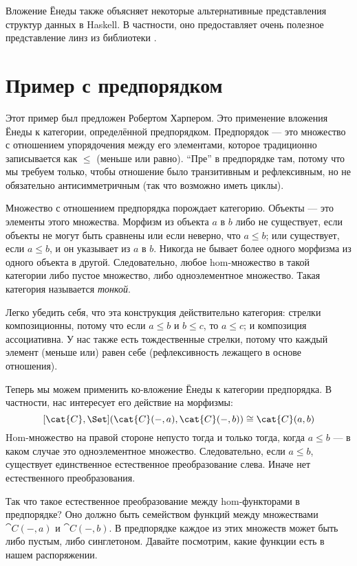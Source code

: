Вложение Ёнеды также объясняет некоторые альтернативные
представления структур данных в Haskell. В частности, оно
предоставляет 
{очень полезное представление}
линз из библиотеки .

\section{Пример с предпорядком}

Этот пример был предложен Робертом Харпером. Это применение
вложения Ёнеды к категории, определённой предпорядком. Предпорядок --- это
множество с отношением упорядочения между его элементами, которое традиционно
записывается как $\leqslant$ (меньше или равно). ``Пре'' в
предпорядке там, потому что мы требуем только, чтобы отношение было
транзитивным и рефлексивным, но не обязательно антисимметричным (так что
возможно иметь циклы).

Множество с отношением предпорядка порождает категорию. Объекты
--- это элементы этого множества. Морфизм из объекта $a$ в
$b$ либо не существует, если объекты не могут быть сравнены или если
неверно, что $a \leqslant b$; или существует, если
$a \leqslant b$, и он указывает из $a$ в
$b$. Никогда не бывает более одного морфизма из одного объекта в
другой. Следовательно, любое hom-множество в такой категории либо пустое множество,
либо одноэлементное множество. Такая категория называется \emph{тонкой}.

Легко убедить себя, что эта конструкция действительно категория:
стрелки композиционны, потому что если
$a \leqslant b$ и $b \leqslant c$, то
$a \leqslant c$; и композиция ассоциативна. У нас также
есть тождественные стрелки, потому что каждый элемент (меньше или) равен
себе (рефлексивность лежащего в основе отношения).

Теперь мы можем применить ко-вложение Ёнеды к категории предпорядка. В
частности, нас интересует его действие на морфизмы:
\[[\cat{C}, \Set](\cat{C}(-, a), \cat{C}(-, b)) \cong \cat{C}(a, b)\]
Hom-множество на правой стороне непусто тогда и только тогда, когда
$a \leqslant b$ --- в каком случае это одноэлементное множество.
Следовательно, если $a \leqslant b$, существует единственное
естественное преобразование слева. Иначе нет естественного
преобразования.

Так что такое естественное преобразование между hom-функторами в предпорядке?
Оно должно быть семейством функций между множествами $\cat{C}(-, a)$ и
$\cat{C}(-, b)$. В предпорядке каждое из этих множеств может быть либо пустым,
либо синглетоном. Давайте посмотрим, какие функции есть в нашем
распоряжении.


